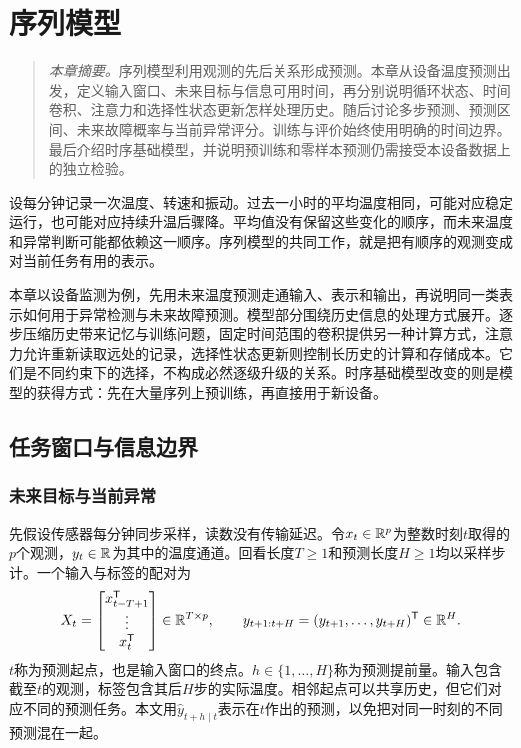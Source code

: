 \chapter{序列模型}
\begin{quote}\small
\textit{本章摘要。}序列模型利用观测的先后关系形成预测。本章从设备温度预测出发，定义输入窗口、未来目标与信息可用时间，再分别说明循环状态、时间卷积、注意力和选择性状态更新怎样处理历史。随后讨论多步预测、预测区间、未来故障概率与当前异常评分。训练与评价始终使用明确的时间边界。最后介绍时序基础模型，并说明预训练和零样本预测仍需接受本设备数据上的独立检验。
\end{quote}
设每分钟记录一次温度、转速和振动。过去一小时的平均温度相同，可能对应稳定运行，也可能对应持续升温后骤降。平均值没有保留这些变化的顺序，而未来温度和异常判断可能都依赖这一顺序。序列模型的共同工作，就是把有顺序的观测变成对当前任务有用的表示。

本章以设备监测为例，先用未来温度预测走通输入、表示和输出，再说明同一类表示如何用于异常检测与未来故障预测。模型部分围绕历史信息的处理方式展开。逐步压缩历史带来记忆与训练问题，固定时间范围的卷积提供另一种计算方式，注意力允许重新读取远处的记录，选择性状态更新则控制长历史的计算和存储成本。它们是不同约束下的选择，不构成必然逐级升级的关系。时序基础模型改变的则是模型的获得方式：先在大量序列上预训练，再直接用于新设备。

\section{任务窗口与信息边界}
\subsection{未来目标与当前异常}
先假设传感器每分钟同步采样，读数没有传输延迟。令$x_t\in\mathbb{R}^p$为整数时刻$t$取得的$p$个观测，$y_t\in\mathbb{R}$为其中的温度通道。回看长度$T\geq1$和预测长度$H\geq1$均以采样步计。一个输入与标签的配对为
\begin{equation}
 X_t=\begin{bmatrix}x_{t-T+1}^{\mathsf T}\\ \vdots\\x_t^{\mathsf T}\end{bmatrix}\in\mathbb{R}^{T\times p},
 \qquad y_{t+1:t+H}=(y_{t+1},\ldots,y_{t+H})^{\mathsf T}\in\mathbb{R}^H.
 \label{eq:sequence-task-window}
\end{equation}
$t$称为预测起点，也是输入窗口的终点。$h\in\{1,\ldots,H\}$称为预测提前量。输入包含截至$t$的观测，标签包含其后$H$步的实际温度。相邻起点可以共享历史，但它们对应不同的预测任务。本文用$\hat y_{t+h\mid t}$表示在$t$作出的预测，以免把对同一时刻的不同预测混在一起。


